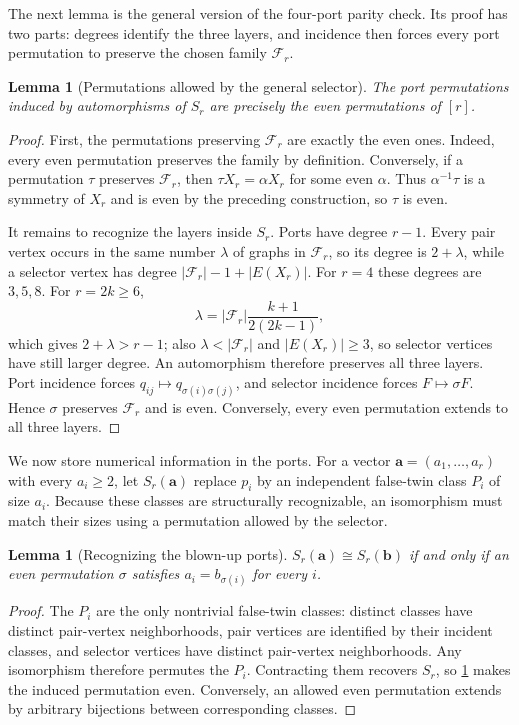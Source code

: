 \documentclass[10pt,a4paper]{amsart}
\newtheorem{lemma}[theorem]{Lemma}
\begin{document}
The next lemma is the general version of the four-port parity check. Its proof has two parts: degrees
identify the three layers, and incidence then forces every port permutation to preserve the chosen
family $\mathcal F_r$.

\begin{lemma}[Permutations allowed by the general selector]\label{lem:selector}
The port permutations induced by automorphisms of $S_r$ are precisely the even permutations of $[r]$.
\end{lemma}
\begin{proof}
First, the permutations preserving $\mathcal F_r$ are exactly the even ones. Indeed, every even
permutation preserves the family by definition. Conversely, if a permutation $\tau$ preserves
$\mathcal F_r$, then $\tau X_r=\alpha X_r$ for some even $\alpha$. Thus
$\alpha^{-1}\tau$ is a symmetry of $X_r$ and is even by the preceding construction, so $\tau$ is even.

It remains to recognize the layers inside $S_r$. Ports have degree $r-1$. Every pair vertex occurs in
the same number $\lambda$ of graphs in $\mathcal F_r$, so its degree is $2+\lambda$, while a selector
vertex has degree $|\mathcal F_r|-1+|E(X_r)|$. For $r=4$ these degrees are $3,5,8$. For $r=2k\ge6$,
\[
 \lambda=|\mathcal F_r|\frac{k+1}{2(2k-1)},
\]
which gives $2+\lambda>r-1$; also $\lambda<|\mathcal F_r|$ and $|E(X_r)|\ge3$, so selector vertices
have still larger degree. An automorphism therefore preserves all three layers. Port incidence forces
$q_{ij}\mapsto q_{\sigma(i)\sigma(j)}$, and selector incidence forces $F\mapsto\sigma F$. Hence
$\sigma$ preserves $\mathcal F_r$ and is even. Conversely, every even permutation extends to all three
layers.
\end{proof}

We now store numerical information in the ports. For a vector
$\mathbf a=(a_1,\ldots,a_r)$ with every $a_i\ge2$, let $S_r(\mathbf a)$ replace $p_i$ by an independent
false-twin class $P_i$ of size $a_i$. Because these classes are structurally recognizable, an
isomorphism must match their sizes using a permutation allowed by the selector.

\begin{lemma}[Recognizing the blown-up ports]\label{lem:blowup}
$S_r(\mathbf a)\cong S_r(\mathbf b)$ if and only if an even permutation $\sigma$ satisfies
$a_i=b_{\sigma(i)}$ for every $i$.
\end{lemma}
\begin{proof}
The $P_i$ are the only nontrivial false-twin classes: distinct classes have distinct pair-vertex
neighborhoods, pair vertices are identified by their incident classes, and selector vertices have
distinct pair-vertex neighborhoods. Any isomorphism therefore permutes the $P_i$. Contracting them
recovers $S_r$, so \cref{lem:selector} makes the induced permutation even. Conversely, an allowed even
permutation extends by arbitrary bijections between corresponding classes.
\end{proof}
\end{document}
